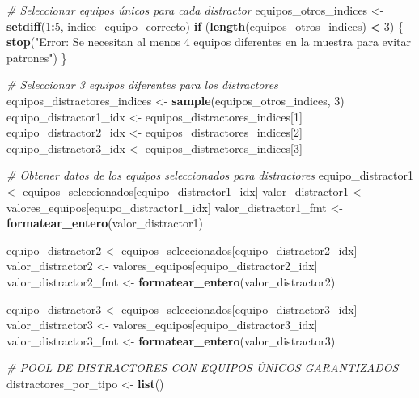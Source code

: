 \documentclass[
]{article}
\newenvironment{Shaded}{\begin{snugshade}}{\end{snugshade}}
\newcommand{\CommentTok}[1]{\textcolor[rgb]{0.56,0.35,0.01}{\textit{#1}}}
\newcommand{\ControlFlowTok}[1]{\textcolor[rgb]{0.13,0.29,0.53}{\textbf{#1}}}
\newcommand{\DecValTok}[1]{\textcolor[rgb]{0.00,0.00,0.81}{#1}}
\newcommand{\FunctionTok}[1]{\textcolor[rgb]{0.13,0.29,0.53}{\textbf{#1}}}
\newcommand{\NormalTok}[1]{#1}
\newcommand{\OtherTok}[1]{\textcolor[rgb]{0.56,0.35,0.01}{#1}}
\newcommand{\SpecialCharTok}[1]{\textcolor[rgb]{0.81,0.36,0.00}{\textbf{#1}}}
\newcommand{\StringTok}[1]{\textcolor[rgb]{0.31,0.60,0.02}{#1}}
\begin{document}
\begin{Shaded}
\begin{Highlighting}[]
\CommentTok{\# Seleccionar equipos únicos para cada distractor}
\NormalTok{equipos\_otros\_indices }\OtherTok{\textless{}{-}} \FunctionTok{setdiff}\NormalTok{(}\DecValTok{1}\SpecialCharTok{:}\DecValTok{5}\NormalTok{, indice\_equipo\_correcto)}
\ControlFlowTok{if}\NormalTok{ (}\FunctionTok{length}\NormalTok{(equipos\_otros\_indices) }\SpecialCharTok{\textless{}} \DecValTok{3}\NormalTok{) \{}
  \FunctionTok{stop}\NormalTok{(}\StringTok{"Error: Se necesitan al menos 4 equipos diferentes en la muestra para evitar patrones"}\NormalTok{)}
\NormalTok{\}}

\CommentTok{\# Seleccionar 3 equipos diferentes para los distractores}
\NormalTok{equipos\_distractores\_indices }\OtherTok{\textless{}{-}} \FunctionTok{sample}\NormalTok{(equipos\_otros\_indices, }\DecValTok{3}\NormalTok{)}
\NormalTok{equipo\_distractor1\_idx }\OtherTok{\textless{}{-}}\NormalTok{ equipos\_distractores\_indices[}\DecValTok{1}\NormalTok{]}
\NormalTok{equipo\_distractor2\_idx }\OtherTok{\textless{}{-}}\NormalTok{ equipos\_distractores\_indices[}\DecValTok{2}\NormalTok{]}
\NormalTok{equipo\_distractor3\_idx }\OtherTok{\textless{}{-}}\NormalTok{ equipos\_distractores\_indices[}\DecValTok{3}\NormalTok{]}

\CommentTok{\# Obtener datos de los equipos seleccionados para distractores}
\NormalTok{equipo\_distractor1 }\OtherTok{\textless{}{-}}\NormalTok{ equipos\_seleccionados[equipo\_distractor1\_idx]}
\NormalTok{valor\_distractor1 }\OtherTok{\textless{}{-}}\NormalTok{ valores\_equipos[equipo\_distractor1\_idx]}
\NormalTok{valor\_distractor1\_fmt }\OtherTok{\textless{}{-}} \FunctionTok{formatear\_entero}\NormalTok{(valor\_distractor1)}

\NormalTok{equipo\_distractor2 }\OtherTok{\textless{}{-}}\NormalTok{ equipos\_seleccionados[equipo\_distractor2\_idx]}
\NormalTok{valor\_distractor2 }\OtherTok{\textless{}{-}}\NormalTok{ valores\_equipos[equipo\_distractor2\_idx]}
\NormalTok{valor\_distractor2\_fmt }\OtherTok{\textless{}{-}} \FunctionTok{formatear\_entero}\NormalTok{(valor\_distractor2)}

\NormalTok{equipo\_distractor3 }\OtherTok{\textless{}{-}}\NormalTok{ equipos\_seleccionados[equipo\_distractor3\_idx]}
\NormalTok{valor\_distractor3 }\OtherTok{\textless{}{-}}\NormalTok{ valores\_equipos[equipo\_distractor3\_idx]}
\NormalTok{valor\_distractor3\_fmt }\OtherTok{\textless{}{-}} \FunctionTok{formatear\_entero}\NormalTok{(valor\_distractor3)}

\CommentTok{\# POOL DE DISTRACTORES CON EQUIPOS ÚNICOS GARANTIZADOS}
\NormalTok{distractores\_por\_tipo }\OtherTok{\textless{}{-}} \FunctionTok{list}\NormalTok{()}


\end{Highlighting}
\end{Shaded}
\end{document}
